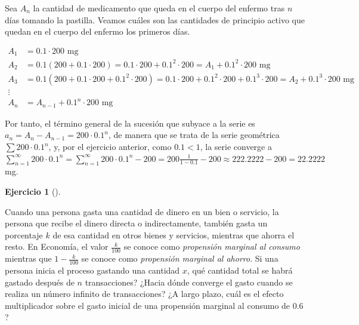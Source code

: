 \documentclass[
  spanish,
  a4paper,
]{scrreport}
\theoremstyle{definition}
\newtheorem{exercise}{Ejercicio}[chapter]
\theoremstyle{remark}
\begin{document}
\begin{tcolorbox}[enhanced jigsaw, arc=.35mm, bottomrule=.15mm, bottomtitle=1mm, breakable, colback=white, colbacktitle=quarto-callout-tip-color!10!white, colframe=quarto-callout-tip-color-frame, coltitle=black, left=2mm, leftrule=.75mm, opacityback=0, opacitybacktitle=0.6, rightrule=.15mm, title=\textcolor{quarto-callout-tip-color}{\faLightbulb}\hspace{0.5em}{Solución}, titlerule=0mm, toprule=.15mm, toptitle=1mm]

Sea \(A_n\) la cantidad de medicamento que queda en el cuerpo del
enfermo tras \(n\) días tomando la pastilla. Veamos cuáles son las
cantidades de principio activo que quedan en el cuerpo del enfermo los
primeros días.

\begin{align*}
A_1 &= 0.1\cdot 200 \mbox{ mg}\\ 
A_2 &= 0.1 (200 + 0.1\cdot 200) = 0.1\cdot 200 + 0.1^2 \cdot 200 = A_1 + 0.1^2\cdot 200 \mbox{ mg}\\ 
A_3 &= 0.1 (200 + 0.1\cdot 200 + 0.1^2 \cdot 200) = 0.1\cdot 200 + 0.1^2 \cdot 200 + 0.1^3\cdot 200 = A_2 + 0.1^3\cdot 200 \mbox{ mg}\\ 
\vdots\\
A_n &= A_{n-1} + 0.1^n \cdot 200 \mbox{ mg}
\end{align*}

Por tanto, el término general de la sucesión que subyace a la serie es
\(a_n = A_n-A_{n-1} = 200\cdot 0.1^n\), de manera que se trata de la
serie geométrica \(\sum 200\cdot 0.1^n\), y, por el ejercicio anterior,
como \(0.1<1\), la serie converge a
\(\sum_{n=1}^\infty 200\cdot 0.1^n = \sum_{n=1}^\infty 200\cdot 0.1^n - 200 = 200\frac{1}{1-0.1} - 200 \approx 222.2222 - 200 = 22.2222\)
mg.

\end{tcolorbox}

\begin{exercise}[]\protect\hypertarget{exr-propensiones-marginales-gasto-ahorro}{}\label{exr-propensiones-marginales-gasto-ahorro}

Cuando una persona gasta una cantidad de dinero en un bien o servicio,
la persona que recibe el dinero directa o indirectamente, también gasta
un porcentaje \(k\) de esa cantidad en otros bienes y servicios,
mientras que ahorra el resto. En Economía, el valor \(\frac{k}{100}\) se
conoce como \emph{propensión marginal al consumo} mientras que
\(1-\frac{k}{100}\) se conoce como \emph{propensión marginal al ahorro}.
Si una persona inicia el proceso gastando una cantidad \(x\), qué
cantidad total se habrá gastado después de \(n\) transacciones? ¿Hacia
dónde converge el gasto cuando se realiza un número infinito de
transacciones? ¿A largo plazo, cuál es el efecto multiplicador sobre el
gasto inicial de una propensión marginal al consumo de \(0.6\)?

\end{exercise}
\end{document}
